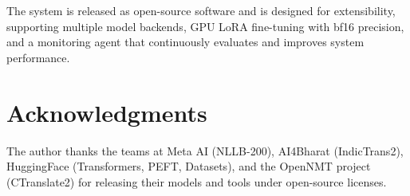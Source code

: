 \documentclass[conference]{IEEEtran}
\begin{document}
The system is released as open-source software and is designed for extensibility,
supporting multiple model backends, GPU LoRA fine-tuning with bf16 precision, and a
monitoring agent that continuously evaluates and improves system performance.

\section*{Acknowledgments}

The author thanks the teams at Meta AI (NLLB-200), AI4Bharat (IndicTrans2),
HuggingFace (Transformers, PEFT, Datasets), and the OpenNMT project (CTranslate2)
for releasing their models and tools under open-source licenses.
\end{document}

